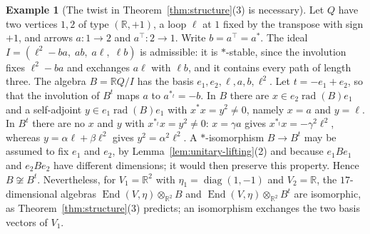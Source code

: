 \documentclass[12pt, a4paper]{report}
\theoremstyle{plain}
\theoremstyle{definition}
\newtheorem{example}[theorem]{Example}
\theoremstyle{remark}
\theoremstyle{plain}
\newcommand{\rad}[0]{\operatorname{rad}} %
\newcommand{\RR}{\mathbb{R}}
\DeclareMathOperator{\End}{End}
\DeclareMathOperator{\diag}{diag}
\begin{document}
\begin{example}[The twist in Theorem~\ref{thm:structure}(3) is necessary]\label{ex:structure-twist}
Let $Q$ have two vertices $1,2$ of type $(\RR,+1)$, a loop $\ell$ at $1$ fixed by the transpose with sign $+1$, and arrows $a:1\to2$ and $a^{\top}:2\to1$. Write $b=a^{\top}=a^*$. The ideal $I=(\ell^2-ba,\;ab,\;a\ell,\;\ell b)$ is admissible: it is $*$-stable, since the involution fixes $\ell^2-ba$ and exchanges $a\ell$ with $\ell b$, and it contains every path of length three. The algebra $B=\RR Q/I$ has the basis $e_1,e_2,\ell,a,b,\ell^2$. Let $t=-e_1+e_2$, so that the involution of $B^t$ maps $a$ to $a^{*_t}=-b$. In $B$ there are $x\in e_2\rad(B)e_1$ and a self-adjoint $y\in e_1\rad(B)e_1$ with $x^*x=y^2\neq0$, namely $x=a$ and $y=\ell$. In $B^t$ there are no $x$ and $y$ with $x^{*_t}x=y^2\neq0$: $x=\gamma a$ gives $x^{*_t}x=-\gamma^2\ell^2$, whereas $y=\alpha\ell+\beta\ell^2$ gives $y^2=\alpha^2\ell^2$. A $*$-isomorphism $B\to B^t$ may be assumed to fix $e_1$ and $e_2$, by Lemma~\ref{lem:unitary-lifting}(2) and because $e_1Be_1$ and $e_2Be_2$ have different dimensions; it would then preserve this property. Hence $B\not\cong B^t$. Nevertheless, for $V_1=\RR^2$ with $\eta_1=\diag(1,-1)$ and $V_2=\RR$, the $17$-dimensional algebras $\End(V,\eta)\otimes_{\RR^2}B$ and $\End(V,\eta)\otimes_{\RR^2}B^t$ are isomorphic, as Theorem~\ref{thm:structure}(3) predicts; an isomorphism exchanges the two basis vectors of $V_1$.
\end{example}
\end{document}
